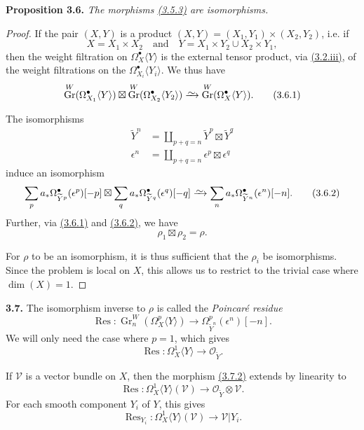 \documentclass{report}
\newenvironment{itenv}[1]
  {\phantomsection\par\medskip\noindent\textbf{#1.}\itshape}
  {\medskip}
\newenvironment{rmenv}[1]
  {\phantomsection\par\medskip\noindent\textbf{#1.}\rmfamily}
  {\medskip}
\renewcommand{\cal}[1]{{\mathcal{#1}}}
\newcommand{\simto}{\xrightarrow{\raisebox{-0.7ex}[0ex][0ex]{$\sim$}}}
\DeclareMathOperator{\Gr}{Gr}
\DeclareMathOperator{\Res}{Res}
\newcommand{\oldpage}[1]{\marginpar{\footnotesize$\Big\vert$ \textit{p.~#1}}}
\begin{document}
\begin{itenv}{Proposition 3.6}
\label{II.3.6}
  The morphisms \hyperref[II.3.5.3]{(3.5.3)} are isomorphisms.
\end{itenv}

\begin{proof}
  If the pair $(X,Y)$ is a product $(X,Y)=(X_1,Y_1)\times(X_2,Y_2)$, i.e. if
  \[
    X = X_1\times X_2
    \quad\mbox{and}\quad
    Y = X_1\times Y_2 \cup X_2\times Y_1,
  \]
\oldpage{77}
  then the weight filtration on $\Omega_X^\bullet\langle Y\rangle$ is the external tensor product, via \hyperref[II.3.2]{(3.2.iii)}, of the weight filtrations on the $\Omega_{X_i}^\bullet\langle Y_i\rangle$.
  We thus have
  \[
  \label{II.3.6.1}
    \Gr^W(\Omega_{X_1}^\bullet\langle Y\rangle) \boxtimes \Gr^W(\Omega_{X_2}^\bullet\langle Y_2\rangle)
    \simto \Gr^W(\Omega_X^\bullet\langle Y\rangle).
  \tag{3.6.1}
  \]

  The isomorphisms
  \[
    \begin{aligned}
      \widetilde{Y}^n
      &= \coprod_{p+q=n} \widetilde{Y}^p\boxtimes\widetilde{Y}^q
    \\\epsilon^n
      &= \coprod_{p+q=n} \epsilon^p\boxtimes\epsilon^q
    \end{aligned}
  \]
  induce an isomorphism
  \[
  \label{II.3.6.2}
    \sum_p a_*\Omega_{\widetilde{Y}^p}^\bullet(\epsilon^p)[-p]
    \boxtimes
    \sum_q a_*\Omega_{\widetilde{Y}^q}^\bullet(\epsilon^q)[-q]
    \simto
    \sum_n a_*\Omega_{\widetilde{Y}^n}^\bullet(\epsilon^n)[-n].
  \tag{3.6.2}
  \]
  Further, via \hyperref[II.3.6.1]{(3.6.1)} and \hyperref[II.3.6.2]{(3.6.2)}, we have
  \[
  \label{II.3.6.3}
    \rho_1\boxtimes\rho_2 = \rho.
  \tag{3.6.3}
  \]

  For $\rho$ to be an isomorphism, it is thus sufficient that the $\rho_i$ be isomorphisms.
  Since the problem is local on $X$, this allows us to restrict to the trivial case where $\dim(X)=1$.
\end{proof}

\begin{rmenv}{3.7}
\label{II.3.7}
  The isomorphism inverse to $\rho$ is called the \emph{Poincar\'{e} residue}
  \[
  \label{II.3.7.1}
    \Res\colon \Gr_n^W(\Omega_X^p\langle Y\rangle) \to \Omega_{\widetilde{Y}^n}^p(\epsilon^n)[-n].
  \tag{3.7.1}
  \]
  We will only need the case where $p=1$, which gives
  \[
  \label{II.3.7.2}
    \Res\colon \Omega_X^1\langle Y\rangle \to \cal{O}_{\widetilde{Y}}.
  \tag{3.7.2}
  \]

  If $\cal{V}$ is a vector bundle on $X$, then the morphism \hyperref[II.3.7.2]{(3.7.2)} extends by linearity to
  \[
  \label{II.3.7.3}
    \Res\colon \Omega_X^1\langle Y\rangle(\cal{V}) \to \cal{O}_{\widetilde{Y}}\otimes\cal{V}.
  \tag{3.7.3}
  \]
  For each smooth component $Y_i$ of $Y$, this gives
\oldpage{78}
  \[
  \label{II.3.7.4}
    \Res_{Y_i}\colon \Omega_X^1\langle Y\rangle(\cal{V}) \to \cal{V}|Y_i.
  \tag{3.7.4}
  \]
\end{rmenv}
\end{document}
